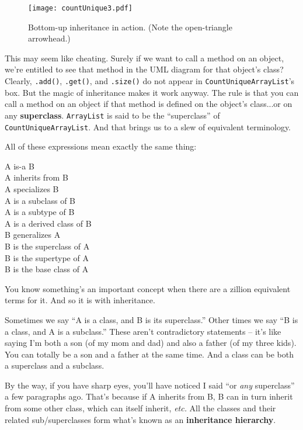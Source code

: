 \begin{figure}[h]
\centering
\texttt{[image: countUnique3.pdf]}
\caption{Bottom-up inheritance in action. (Note the open-triangle arrowhead.)}
\label{fig:countUnique3}
\end{figure}

This may seem like cheating. Surely if we want to call a method on an object,
we're entitled to see that method in the UML diagram for that object's class?
Clearly, \texttt{.add()}, \texttt{.get()}, and \texttt{.size()} do not appear
in \texttt{CountUniqueArrayList}'s box. But the magic of inheritance makes it
work anyway. The rule is that you can call a method on an object if that
method is defined on the object's class...or on any \textbf{superclass}.
\texttt{ArrayList} is said to be the ``superclass'' of
\texttt{CountUniqueArrayList}. And that brings us to a slew of equivalent
terminology.

\begin{samepage}
All of these expressions mean exactly the same thing:
\begin{center}
\small
A is-a B\\
A inherits from B\\
A specializes B\\
A is a subclass of B\\
A is a subtype of B\\
A is a derived class of B\\
B generalizes A\\
B is the superclass of A\\
B is the supertype of A\\
B is the base class of A\\
\end{center}
\end{samepage}

You know something's an important concept when there are a zillion equivalent
terms for it. And so it is with inheritance.

Sometimes we say ``A is a class, and B is its superclass.'' Other times we say
``B is a class, and A is a subclass.'' These aren't contradictory statements --
it's like saying I'm both a son (of my mom and dad) and also a father (of my
three kids). You can totally be a son and a father at the same time. And a
class can be both a superclass and a subclass.

By the way, if you have sharp eyes, you'll have noticed I said ``or
\textit{any} superclass'' a few paragraphs ago. That's because if A inherits
from B, B can in turn inherit from some other class, which can itself inherit,
\textit{etc.} All the classes and their related sub/superclasses form what's
known as an \textbf{inheritance hierarchy}.

